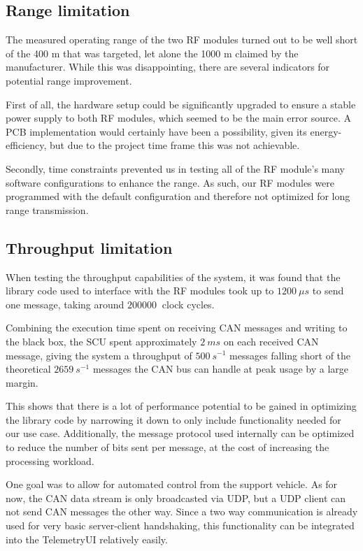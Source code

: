 \documentclass[a4paper,conference]{IEEEtran}
\begin{document}
\subsection{Range limitation}
The measured operating range of the two RF modules turned out to be well short of the 400 m that was targeted, let alone the 1000 m claimed by the manufacturer. While this was disappointing, there are several indicators for potential range improvement. 

First of all, the hardware setup could be significantly upgraded to ensure a stable power supply to both RF modules, which seemed to be the main error source. A PCB implementation would certainly have been a possibility, given its energy-efficiency, but due to the project time frame this was not achievable. 

Secondly, time constraints prevented us in testing all of the RF module's many software configurations to enhance the range. As such, our RF modules were programmed with the default configuration and therefore not optimized for long range transmission. 

\subsection{Throughput limitation}
When testing the throughput capabilities of the system, it was found that the library code used to interface with the RF modules took up to $\SI{1200}{\mu s}$ to send one message, taking around $\SI{200000}{}$ clock cycles.

Combining the execution time spent on receiving CAN messages and writing to the black box, the SCU spent approximately $\SI{2}{ms}$ on each received CAN message, giving the system a throughput of $\SI{500}{s^{-1}}$ messages falling short of the theoretical $\SI{2659}{s^{-1}}$ messages the CAN bus can handle at peak usage by a large margin.

This shows that there is a lot of performance potential to be gained in optimizing the library code by narrowing it down to only include functionality needed for our use case. Additionally, the message protocol used internally can be optimized to reduce the number of bits sent per message, at the cost of increasing the processing workload.

One goal was to allow for automated control from the support vehicle. As for now, the CAN data stream is only broadcasted via UDP, but a UDP client can not send CAN messages the other way. Since a two way communication is already used for very basic server-client handshaking, this functionality can be integrated into the TelemetryUI relatively easily.
\end{document}
